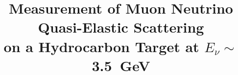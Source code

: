 \documentclass[aps,prl,twocolumn,showpacs,superscriptaddress,nofootinbib]{revtex4}
\newcommand{\dsdq}{\ensuremath{d\sigma/dQ^2}\xspace}
\begin{document}
\title{Measurement of Muon Neutrino Quasi-Elastic Scattering \\ on a Hydrocarbon Target at $E_{\nu} \sim$ 3.5~GeV}


\newcommand{\deceased}{Deceased}

\newcommand{\wroclaw}{Institute of Theoretical Physics, Wroc\l aw University, Wroc\l aw, Poland}    


\end{document}
